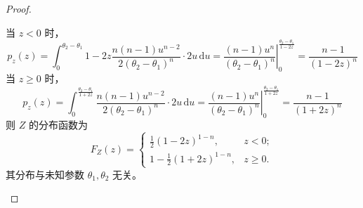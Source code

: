 \documentclass[normal,founder,mtpro2,cn]{elegantnote}
\begin{document}
\begin{enumerate}
\begin{proof}
\begin{enumerate}
\begin{equation*}
                      \end{equation*}
                      当 $z<0$ 时，
                      \begin{equation*}
                          p_{z}(z)=\int_{0}^{\theta_{2}-\theta_{1}}{1-2z}\frac{n(n-1)u^{n-2}}{2\left(\theta_{2}-\theta_{1}\right)^{n}}\cdot 2u\,\mathrm{d}u=\left.\frac{(n-1)u^{n}}{\left(\theta_{2}-\theta_{1}\right)^{n}}\right|_{0}^{\frac{\theta_{2}-\theta_{1}}{1-2z}}=\frac{n-1}{(1-2z)^{n}}
                      \end{equation*}
                      当 $z\geq 0$ 时，
                      \begin{equation*}
                          p_{z}(z)=\int_{0}^{\frac{\theta_{2}-\theta_{1}}{1+2z}}\frac{n(n-1)u^{n-2}}{2\left(\theta_{2}-\theta_{1}\right)^{n}}\cdot 2u\,\mathrm{d}u=\left.\frac{(n-1)u^{n}}{\left(\theta_{2}-\theta_{1}\right)^{n}}\right|_{0}^{\frac{\theta_{2}-\theta_{1}}{1+2z}}=\frac{n-1}{(1+2z)^{n}}
                      \end{equation*}
                      则 $Z$ 的分布函数为
                      \begin{equation*}
                          F_{Z}(z)=\left\{\begin{array}{ll}
                              \frac{1}{2}(1-2 z)^{1-n},   & z<0 ;     \\
                              1-\frac{1}{2}(1+2 z)^{1-n}, & z\geq 0 .
                          \end{array}\right.
                      \end{equation*}
                      其分布与未知参数 $\theta_{1},\theta_{2}$ 无关。


\end{enumerate}
\end{proof}
\end{enumerate}
\end{document}
